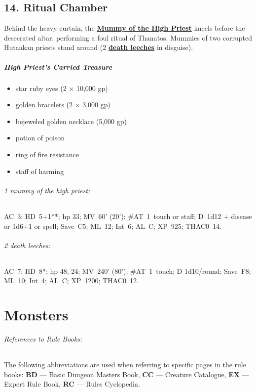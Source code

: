 \documentclass[english,11pt,openany,letterpaper,twocolumn]{book}
\begin{document}
\hypertarget{room14}{}
\section{14. Ritual Chamber}

Behind the heavy curtain, the \hyperlink{mummy}{\textbf{Mummy of the High Priest}} kneels before the desecrated altar, performing a foul ritual of Thanatos. Mummies of two corrupted Hutaakan priests stand around (2 \hyperlink{leech}{\textbf{death leeches}} in disguise).

\skipline
\paragraph{High Priest's Carried Treasure}
\begin{itemize}[leftmargin=*]
\item star ruby eyes (2 × 10,000 gp)
\item golden bracelets (2 × 3,000 gp)
\item bejeweled golden necklace (5,000 gp)
\item potion of poison
\item ring of fire resistance
\item staff of harming
\end{itemize}


\begin{textbox}
	\subparagraph{1 mummy of the high priest:} AC~3; HD~5+1**; hp 33; MV~60' (20'); \#AT~1~touch or staff; D~1d12 + disease or 1d6+1 or spell; Save~C5; ML~12; Int~6; AL~C; XP~925; THAC0~14.
	
	\skipline
	\subparagraph{2 death leeches:} AC~7; HD~8*; hp 48, 24; MV~240' (80'); \#AT~1~touch; D 1d10/round; Save~F8; ML~10; Int~4; AL~C; XP~1200; THAC0~12.
\end{textbox}
\enlargethispage{\baselineskip}

\cleartorightpage
\onecolumn

\chapter{Monsters}

\subparagraph{References to Rule Books:}
The following abbreviations are used when referring to specific pages in the rule books:
\textbf{BD} --- Basic Dungeon Masters Book,
\textbf{CC} --- Creature Catalogue,
\textbf{EX} --- Expert Rule Book,
\textbf{RC} --- Rules Cyclopedia.

\newcommand{\setAnimalTabPositions}{%
	\setCustomTabPositions{%
		4,	4,	11,	16,	15,	6,	4,	5,	4,	5}%
}
\end{document}
